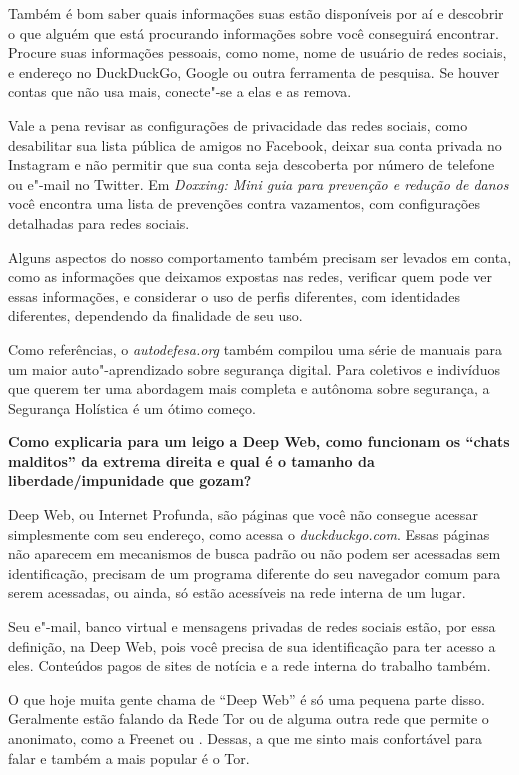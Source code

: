 Também é bom saber quais informações suas estão disponíveis por aí e
descobrir o que alguém que está procurando informações sobre você
conseguirá encontrar. Procure suas informações pessoais, como nome, nome
de usuário de redes sociais,  e endereço no DuckDuckGo, Google ou
outra ferramenta de pesquisa. Se houver contas que não usa mais,
conecte"-se a elas e as remova.

Vale a pena revisar as configurações de privacidade das redes sociais,
como desabilitar sua lista pública de amigos no Facebook, deixar sua
conta privada no Instagram e não permitir que sua conta seja descoberta
por número de telefone ou e"-mail no Twitter. Em
\emph{Doxxing:
Mini guia para prevenção e redução de danos} você encontra uma
lista de prevenções contra vazamentos, com configurações detalhadas para
redes sociais.

Alguns aspectos do nosso comportamento também precisam ser levados em
conta, como as informações que deixamos expostas nas redes, verificar quem
pode ver essas informações, e considerar o uso de perfis diferentes, com
identidades diferentes, dependendo da finalidade de seu uso.

Como referências, o \emph{autodefesa.org} também compilou uma série de manuais para um maior auto"-aprendizado
sobre segurança digital. Para coletivos e indivíduos que querem ter uma
abordagem mais completa e autônoma sobre segurança, a
Segurança Holística é um ótimo começo.

\bigskip

\noindent{}\textbf{Como explicaria para um leigo a Deep Web, como funcionam os
``chats malditos'' da extrema direita e qual é o tamanho da
liberdade/impunidade que gozam?}

Deep Web, ou Internet Profunda, são páginas que
você não consegue acessar simplesmente com seu endereço, como acessa o
\emph{duckduckgo.com}. Essas páginas não aparecem em mecanismos de busca padrão
ou não podem ser acessadas sem identificação, precisam de um programa
diferente do seu navegador comum para serem acessadas, ou ainda, só
estão acessíveis na rede interna de um lugar.

Seu e"-mail, banco virtual e mensagens privadas de redes sociais estão,
por essa definição, na Deep Web, pois você precisa de sua identificação
para ter acesso a eles. Conteúdos pagos de sites de notícia e a rede
interna do trabalho também.

O que hoje muita gente chama de ``Deep Web'' é só uma pequena parte disso.
Geralmente estão falando da Rede Tor ou de alguma outra rede que permite
o anonimato, como a Freenet ou . Dessas, a que me sinto mais
confortável para falar e também a mais popular é o Tor.

